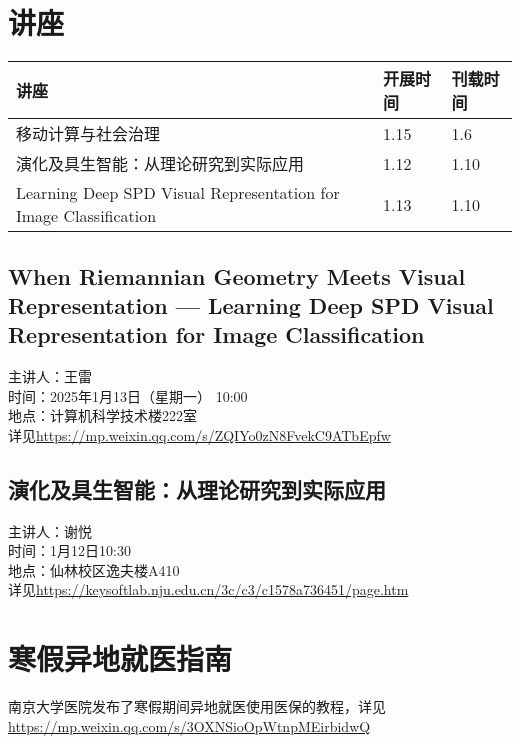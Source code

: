 \documentclass[letterpaper, 12pt]{article}
\begin{document}
\begin{multicols}{2}

\section{讲座}
\begin{tabular}{|>{\centering\arraybackslash}m{}|m{}|m{}|}
    \hline
    讲座 & 开展时间 & 刊载时间\\
    \hline\hline
    移动计算与社会治理 & 1.15 & 1.6\\\hline 
    演化及具生智能：从理论研究到实际应用 & 1.12 & 1.10\\\hline
    Learning Deep SPD Visual Representation for Image Classification & 1.13 & 1.10\\\hline
\end{tabular}

\subsection{When Riemannian Geometry Meets Visual Representation — Learning Deep SPD Visual Representation for Image Classification}
主讲人：王雷\\
时间：2025年1月13日（星期一） 10:00\\
地点：计算机科学技术楼222室\\
详见\url{https://mp.weixin.qq.com/s/ZQIYo0zN8FvekC9ATbEpfw}
\subsection{演化及具生智能：从理论研究到实际应用}
主讲人：谢悦\\
时间：1月12日10:30\\
地点：仙林校区逸夫楼A410\\
详见\url{https://keysoftlab.nju.edu.cn/3c/c3/c1578a736451/page.htm}

\section{寒假异地就医指南}
南京大学医院发布了寒假期间异地就医使用医保的教程，详见\url{https://mp.weixin.qq.com/s/3OXNSioOpWtnpMEirbidwQ}

\end{multicols}
\end{document}
